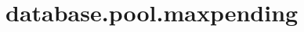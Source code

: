 \section{database.pool.maxpending}
\label{configuration:DatabasePoolMaxpending}
\AvailableInJavaOnly{\TODO}